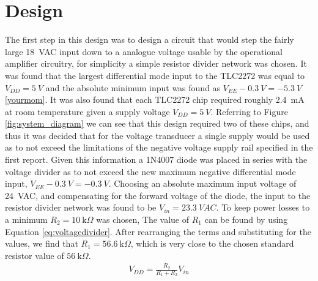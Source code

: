 \section{Design} \label{sec:design_voltage_peak_transducer}
The first step in this design was to design a circuit that would step the fairly large \SI{18}{VAC} input down to a analogue voltage usable by the operational amplifier circuitry, for simplicity a simple resistor divider network was chosen. It was found that the largest differential mode input to the TLC2272 was equal to $V_{DD}=\SI{5}{V}$ and the absolute minimum input was found as $V_{EE}-\SI{0.3}{V}=\SI{-5.3}{V}$ \ref{yourmom}. It was also found that each TLC2272 chip required roughly \SI{2.4}{\milli A} at room temperature given a supply voltage $V_{DD}=\SI{5}{V}$. Referring to Figure \ref{fig:system_diagram} we can see that this design required two of these chips, and thus it was decided that for the voltage transducer a single supply would be used as to not exceed the limitations of the negative voltage supply rail specified in the first report. 
Given this information a 1N4007 diode was placed in series with the voltage divider as to not exceed the new maximum negative differential mode input, $V_{EE}-\SI{0.3}{V}=\SI{-0.3}{V}$. Choosing an absolute maximum input voltage of \SI{24}{VAC}, and compensating for the forward voltage of the diode, the input to the resistor divider network was found to be $V_{in}=\SI{23.3}{VAC}$. To keep power losses to a minimum $R_{2}=\SI{10}{\kilo \Omega}$ was chosen, The value of $R_{1}$ can be found by using Equation \ref{eq:voltagedivider}. After rearranging the terms and substituting for the values, we find that $R_{1}=\SI{56.6}{\kilo \Omega}$, which is very close to the chosen standard resistor value of $\SI{56}{\kilo \Omega}$.\newline
\begin{align}
   V_{DD}=\frac{R_2}{R_1+R_2}V_{in}
   \label{eq:voltagedivider}
\end{align}
